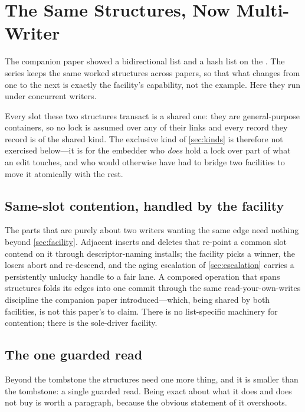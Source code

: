 \documentclass[11pt]{article}
\begin{document}
\section{The Same Structures, Now Multi-Writer}
\label{sec:structures}

The companion paper showed a bidirectional list and a hash list on the
\fliplatch. The series keeps the same worked structures across papers, so that
what changes from one to the next is exactly the facility's capability, not the
example. Here they run under concurrent writers.

Every slot these two structures transact is a shared one: they are general-purpose
containers, so no lock is assumed over any of their links and every record they
record is of the shared kind. The exclusive kind of \cref{sec:kinds} is therefore
not exercised below---it is for the embedder who \emph{does} hold a lock over part
of what an edit touches, and who would otherwise have had to bridge two facilities
to move it atomically with the rest.

\subsection{Same-slot contention, handled by the facility}
\label{sec:contention}

The parts that are purely about two writers wanting the same edge need nothing
beyond \cref{sec:facility}. Adjacent inserts and deletes that re-point a common
 slot contend on it through descriptor-naming installs; the facility
picks a winner, the losers abort and re-descend, and the aging escalation of
\cref{sec:escalation} carries a persistently unlucky handle to a fair lane. A
composed operation that spans structures folds its edges into one commit through
the same read-your-own-writes discipline the companion paper introduced---which,
being shared by both facilities, is not this paper's to claim. There is no
list-specific machinery for contention; there is the sole-driver facility.

\subsection{The one guarded read}
\label{sec:guard}

Beyond the tombstone the structures need one more thing, and it is smaller than
the tombstone: a single guarded read. Being exact about what it does and does not
buy is worth a paragraph, because the obvious statement of it overshoots.
\end{document}
